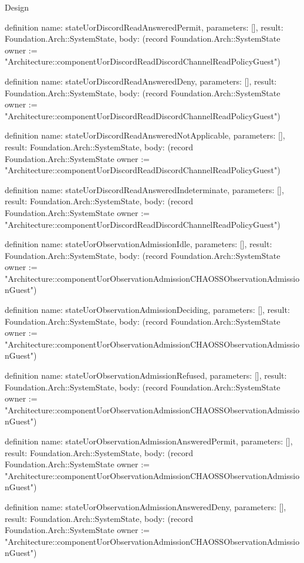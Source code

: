 \begin{lexlean}{Design}
\begin{semanticmodule}
definition{
  name: stateUorDiscordReadAnsweredPermit,
  parameters: [],
  result: Foundation.Arch::SystemState,
  body: (record Foundation.Arch::SystemState {owner := "Architecture::componentUorDiscordReadDiscordChannelReadPolicyGuest"})
}

definition{
  name: stateUorDiscordReadAnsweredDeny,
  parameters: [],
  result: Foundation.Arch::SystemState,
  body: (record Foundation.Arch::SystemState {owner := "Architecture::componentUorDiscordReadDiscordChannelReadPolicyGuest"})
}

definition{
  name: stateUorDiscordReadAnsweredNotApplicable,
  parameters: [],
  result: Foundation.Arch::SystemState,
  body: (record Foundation.Arch::SystemState {owner := "Architecture::componentUorDiscordReadDiscordChannelReadPolicyGuest"})
}

definition{
  name: stateUorDiscordReadAnsweredIndeterminate,
  parameters: [],
  result: Foundation.Arch::SystemState,
  body: (record Foundation.Arch::SystemState {owner := "Architecture::componentUorDiscordReadDiscordChannelReadPolicyGuest"})
}

definition{
  name: stateUorObservationAdmissionIdle,
  parameters: [],
  result: Foundation.Arch::SystemState,
  body: (record Foundation.Arch::SystemState {owner := "Architecture::componentUorObservationAdmissionCHAOSSObservationAdmissionGuest"})
}

definition{
  name: stateUorObservationAdmissionDeciding,
  parameters: [],
  result: Foundation.Arch::SystemState,
  body: (record Foundation.Arch::SystemState {owner := "Architecture::componentUorObservationAdmissionCHAOSSObservationAdmissionGuest"})
}

definition{
  name: stateUorObservationAdmissionRefused,
  parameters: [],
  result: Foundation.Arch::SystemState,
  body: (record Foundation.Arch::SystemState {owner := "Architecture::componentUorObservationAdmissionCHAOSSObservationAdmissionGuest"})
}

definition{
  name: stateUorObservationAdmissionAnsweredPermit,
  parameters: [],
  result: Foundation.Arch::SystemState,
  body: (record Foundation.Arch::SystemState {owner := "Architecture::componentUorObservationAdmissionCHAOSSObservationAdmissionGuest"})
}

definition{
  name: stateUorObservationAdmissionAnsweredDeny,
  parameters: [],
  result: Foundation.Arch::SystemState,
  body: (record Foundation.Arch::SystemState {owner := "Architecture::componentUorObservationAdmissionCHAOSSObservationAdmissionGuest"})
}


\end{semanticmodule}
\end{lexlean}
